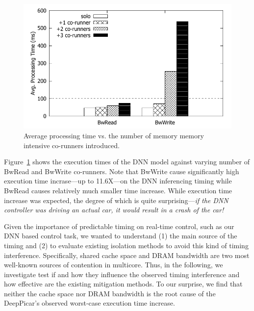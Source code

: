 \begin{figure}[h]
  \centering
  \includegraphics[width=.45\textwidth]{figs/perf_vs_bandwidth}
  \caption{Average processing time vs. the number of memory
    memory intensive co-runners introduced.}
  \label{fig:perf_vs_bandwidth}
\end{figure}


Figure~\ref{fig:perf_vs_bandwidth} shows the execution times of the DNN 
model against varying number of BwRead and BwWrite co-runners. Note
that BwWrite cause significantly high execution time incrase---up 
to 11.6X---on the DNN inferencing timing while BwRead causes
relatively much smaller time increase. While execution time increase
was expected, the degree of which is quite surprising---\emph{if the DNN
controller was driving an actual car, it would result in a crash of the
car!}

Given the importance of predictable timing on real-time control, such
as our DNN based control task, we wanted to understand (1) the main
source of the timing and (2) to evaluate existing isolation methods to
avoid this kind of timing interference. Specifically, shared cache
space and DRAM bandwidth are two most well-known sources of contention
in multicore. Thus, in the following, we investigate test if and how
they influence the observed timing interference and how effective are
the existing mitigation methods. To our surprise, we find that neither
the cache space nor DRAM bandwidth is the root cause of the
DeepPicar's observed worst-case execution time increase.


